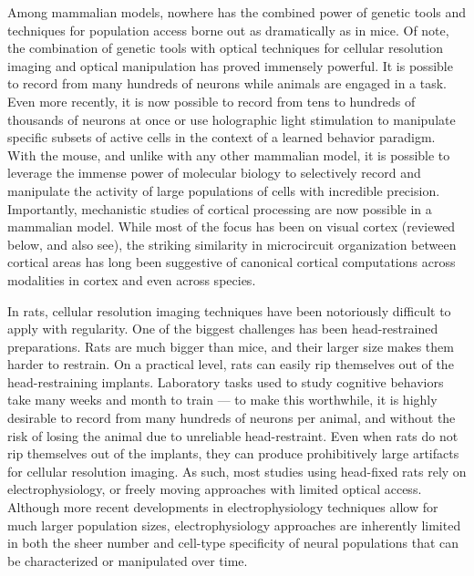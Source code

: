 Among mammalian models, nowhere has the combined power of genetic tools and techniques for population access borne out as dramatically as in mice. Of note, the combination of genetic tools with optical techniques for cellular resolution imaging and optical manipulation has proved immensely powerful. It is possible to record from many hundreds of neurons while animals are engaged in a task\cite{Andermann2010,Poort2015,Burgess2017}. Even more recently, it is now possible to record from tens to hundreds of thousands of neurons at once\cite{Stringer2019geometry,Weisenburger2019,Stringer2021precision} or use holographic light stimulation to manipulate specific subsets of active cells in the context of a learned behavior paradigm\cite{Chong2019, Gill2020}. With the mouse, and unlike with any other mammalian model, it is possible to leverage the immense power of molecular biology to selectively record and manipulate the activity of large populations of cells with incredible precision. Importantly, mechanistic studies of cortical processing are now possible in a mammalian model. While most of the focus has been on visual cortex (reviewed below, and also see\cite{Huberman2011,Glickfeld2017,Niell2021}), the striking similarity in microcircuit organization between cortical areas has long been suggestive of canonical cortical computations across modalities in cortex and even across species\cite{Miller2016}. 

In rats, cellular resolution imaging techniques have been notoriously difficult to apply with regularity. One of the biggest challenges has been head-restrained preparations. Rats are much bigger than mice, and their larger size makes them harder to restrain. On a practical level, rats can easily rip themselves out of the head-restraining implants. Laboratory tasks used to study cognitive behaviors take many weeks and month to train --- to make this worthwhile, it is highly desirable to record from many hundreds of neurons per animal, and without the risk of losing the animal due to unreliable head-restraint. Even when rats do not rip themselves out of the implants, they can produce prohibitively large artifacts for cellular resolution imaging. As such, most studies using head-fixed rats rely on electrophysiology, or freely moving approaches with limited optical access\cite{Scott2013,Scott2018}. Although more recent developments in electrophysiology techniques allow for much larger population sizes\cite{Steinmetz2018}, electrophysiology approaches are inherently limited in both the sheer number and cell-type specificity of neural populations that can be characterized or manipulated over time. 

